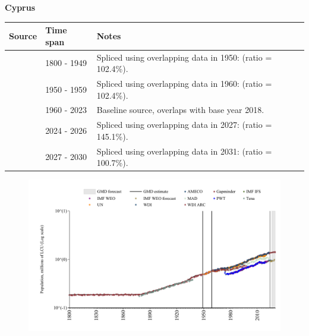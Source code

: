 \documentclass[12pt,a4paper,landscape]{article}
\begin{document}
\begin{adjustbox}{max totalsize={\paperwidth}{\paperheight},center}
\begin{minipage}[t][\textheight][t]{\textwidth}
\vspace*{0.5cm}
{}
\begin{center}
{\Large\bfseries Cyprus}
\end{center}
\vspace{0.5cm}
\begin{table}[H]
\centering
\small
\begin{tabular}{|l|l|l|}
\hline
\textbf{Source} & \textbf{Time span} & \textbf{Notes} \\
\hline
\rowcolor{white}\cite{Gapminder}& 1800 - 1949 &Spliced using overlapping data in 1950: (ratio = 102.4\%).\\
\rowcolor{lightgray}\cite{IMF_IFS}& 1950 - 1959 &Spliced using overlapping data in 1960: (ratio = 102.4\%).\\
\rowcolor{white}\cite{WDI}& 1960 - 2023 &Baseline source, overlaps with base year 2018.\\
\rowcolor{lightgray}\cite{AMECO}& 2024 - 2026 &Spliced using overlapping data in 2027: (ratio = 145.1\%).\\
\rowcolor{white}\cite{Gapminder}& 2027 - 2030 &Spliced using overlapping data in 2031: (ratio = 100.7\%).\\
\hline
\end{tabular}
\end{table}
\begin{figure}[H]
\centering
\includegraphics[width=\textwidth,height=0.6\textheight,keepaspectratio]{graphs/CYP_pop.pdf}
\end{figure}
\end{minipage}
\end{adjustbox}
\end{document}
